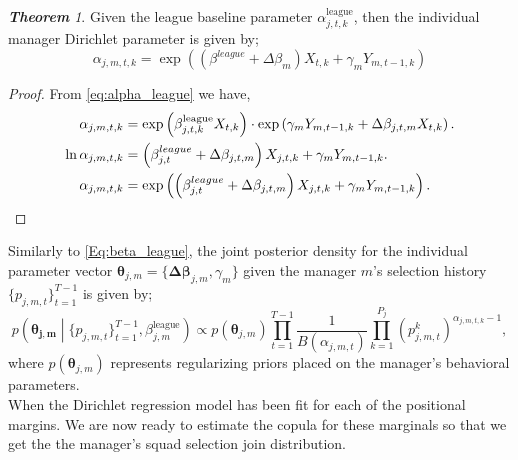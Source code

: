 \documentclass[12pt,oneside,a4paper]{book}
\theoremstyle{definition}
\theoremstyle{remark}
\newtheorem{thm}{\bf Theorem}[subsection]
\begin{document}
				\begin{thm}
					Given the league baseline parameter $\alpha^{\text{league}}_{j,t,k}$, then the individual manager Dirichlet parameter is given by;
					\begin{equation}\label{Eq:alpha_m}
						\alpha_{j,m,t,k} = \exp\left( \left(\beta^{league} + \Delta\beta_m\right)X_{t,k} + \gamma_mY_{m,t-1,k}\right)
					\end{equation}
				\end{thm}
				\begin{proof}
					From \ref{eq:alpha_league} we have,
					\[
						\begin{aligned}
							\alpha_{j,m,t,k} &= \exp\left( \beta^{\text{league}}_{j,t,k} X_{t,k} \right) \cdot \exp\left(\gamma_m Y_{m,t-1,k} + \boldmath{\Delta}\beta_{j,t,m}X_{t,k} \right).\\
							\ln\alpha_{j,m,t,k} &= \left( \beta^{league}_{j,t} + \Delta\beta_{j,t,m}\right)X_{j,t,k} + \gamma_mY_{m,t-1,k}.\\
							\alpha_{j,m,t,k} &= \exp\left( \left( \beta^{league}_{j,t} + \Delta\beta_{j,t,m}\right)X_{j,t,k} + \gamma_mY_{m,t-1,k} \right).
						\end{aligned}
					\]

				\end{proof}

				Similarly to \eqref{Eq:beta_league}, the joint posterior density for the individual parameter vector $\boldsymbol{\theta}_{j,m} = \{\boldsymbol{\Delta\beta}_{j,m}, \gamma_m\}$ given the manager $m$'s selection history $\{p_{j,m,t}\}_{t=1}^{T-1}$ is given by;
				\begin{equation}\label{Eq:posterior_manager}
					p\left(\boldsymbol{\theta_{j,m}} \middle| \{p_{j,m,t}\}_{t=1}^{T-1}, \beta_{j,m}^{\text{league}}\right)
					\propto p(\boldsymbol{\theta}_{j,m}) \prod_{t=1}^{T-1} \frac{1}{B(\alpha_{j,m,t})} \prod_{k=1}^{P_j} \left(p_{j,m,t}^k\right)^{\alpha_{j,m,t,k} - 1},
				\end{equation}
				where $p(\boldsymbol{\theta}_{j,m})$ represents regularizing priors placed on the manager's behavioral parameters.\\  %
				When the Dirichlet regression model has been fit for each of the positional margins. We are now ready to estimate the copula for these marginals so that we get the the manager's squad selection join distribution.
\end{document}
